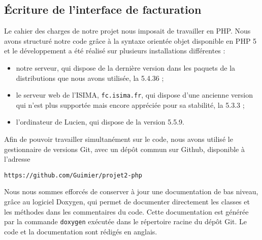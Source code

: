 \subsection{Écriture de l’interface de facturation}

Le cahier des charges de notre projet nous imposait de travailler en PHP. Nous avons structuré notre code grâce à la syntaxe orientée objet disponible en PHP 5 et le développement a été réalisé sur plusieurs installations différentes :
\begin{itemize}
	\item notre serveur, qui dispose de la dernière version dans les paquets de la distributions que nous avons utilisée, la 5.4.36 ;
	\item le serveur web de l’ISIMA, \texttt{fc.isima.fr}, qui dispose d’une ancienne version qui n’est plus supportée mais encore appréciée pour sa stabilité, la 5.3.3 ;
	\item l’ordinateur de Lucien, qui dispose de la version 5.5.9.
\end{itemize}

Afin de pouvoir travailler simultanément sur le code, nous avons utilisé le gestionnaire de versions Git, avec un dépôt commun sur Github, disponible à l’adresse
\begin{verbatim}
https://github.com/Guimier/projet2-php
\end{verbatim}

Nous nous sommes efforcés de conserver à jour une documentation de bas niveau, grâce au logiciel Doxygen, qui permet de documenter directement les classes et les méthodes dans les commentaires du code. Cette documentation est générée par la commande \texttt{doxygen} exécutée dans le répertoire racine du dépôt Git. Le code et la documentation sont rédigés en anglais.
